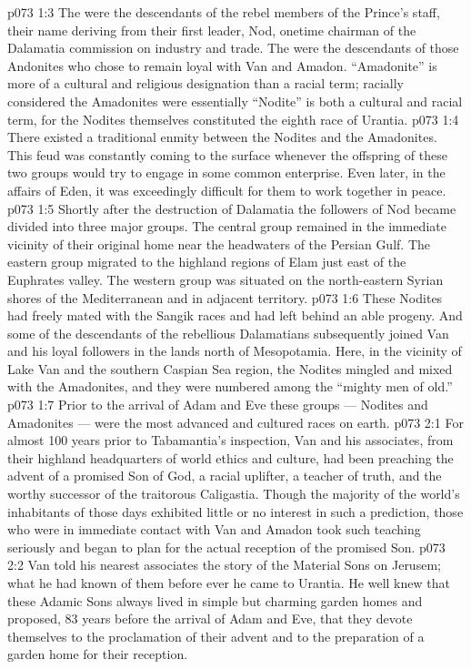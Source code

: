 \vs p073 1:3 The  were the descendants of the rebel members of the Prince’s staff, their name deriving from their first leader, Nod, onetime chairman of the Dalamatia commission on industry and trade. The  were the descendants of those Andonites who chose to remain loyal with Van and Amadon. “Amadonite” is more of a cultural and religious designation than a racial term; racially considered the Amadonites were essentially  “Nodite” is both a cultural and racial term, for the Nodites themselves constituted the eighth race of Urantia.
\vs p073 1:4 There existed a traditional enmity between the Nodites and the Amadonites. This feud was constantly coming to the surface whenever the offspring of these two groups would try to engage in some common enterprise. Even later, in the affairs of Eden, it was exceedingly difficult for them to work together in peace.
\vs p073 1:5 Shortly after the destruction of Dalamatia the followers of Nod became divided into three major groups. The central group remained in the immediate vicinity of their original home near the headwaters of the Persian Gulf. The eastern group migrated to the highland regions of Elam just east of the Euphrates valley. The western group was situated on the north\hyp{}eastern Syrian shores of the Mediterranean and in adjacent territory.
\vs p073 1:6 These Nodites had freely mated with the Sangik races and had left behind an able progeny. And some of the descendants of the rebellious Dalamatians subsequently joined Van and his loyal followers in the lands north of Mesopotamia. Here, in the vicinity of Lake Van and the southern Caspian Sea region, the Nodites mingled and mixed with the Amadonites, and they were numbered among the “mighty men of old.”
\vs p073 1:7 Prior to the arrival of Adam and Eve these groups --- Nodites and Amadonites --- were the most advanced and cultured races on earth.
\vs p073 2:1 For almost 100 years prior to Tabamantia’s inspection, Van and his associates, from their highland headquarters of world ethics and culture, had been preaching the advent of a promised Son of God, a racial uplifter, a teacher of truth, and the worthy successor of the traitorous Caligastia. Though the majority of the world’s inhabitants of those days exhibited little or no interest in such a prediction, those who were in immediate contact with Van and Amadon took such teaching seriously and began to plan for the actual reception of the promised Son.
\vs p073 2:2 Van told his nearest associates the story of the Material Sons on Jerusem; what he had known of them before ever he came to Urantia. He well knew that these Adamic Sons always lived in simple but charming garden homes and proposed, 83 years before the arrival of Adam and Eve, that they devote themselves to the proclamation of their advent and to the preparation of a garden home for their reception.
